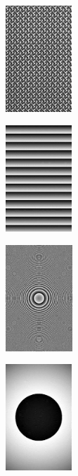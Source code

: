 \begin{figure}
	\begin{subfigure}{.18\linewidth}
		\centering
		\includegraphics[height=4cm]{figures/SLMphase/array.jpg}
		\caption{}
		\label{fig:Array}
	\end{subfigure}
	\begin{subfigure}{.18\linewidth}
		\centering
		\includegraphics[height=4cm]{figures/SLMphase/linear.jpg}
		\caption{}
		\label{fig:Linear}
	\end{subfigure}
	\begin{subfigure}{.18\linewidth}
		\centering
		\includegraphics[height=4cm]{figures/SLMphase/lens.jpg}
		\caption{}
		\label{fig:Lens}
	\end{subfigure}	
	\begin{subfigure}{.18\linewidth}
		\centering
		\includegraphics[height=4cm]{figures/SLMphase/flatness.jpg}

\end{subfigure}
\end{figure}
